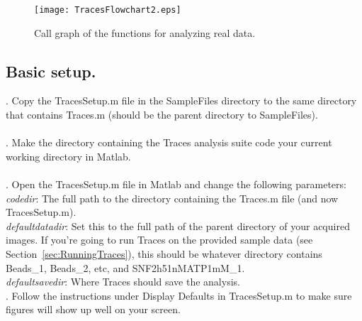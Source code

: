 \documentclass[11pt]{article}
\begin{document}
\begin{figure}[!p]
\begin{center}
\texttt{[image: TracesFlowchart2.eps]}
\caption{Call graph of the functions for analyzing real data.}
\label{fig:CodeConnectivity2}
\end{center}
\end{figure}

\newpage

\subsection{Basic setup.}

%

. Copy the TracesSetup.m file in the SampleFiles directory to the same directory that contains Traces.m (should be the parent directory to SampleFiles). \\
\\
. Make the directory containing the Traces analysis suite code your current working directory in Matlab. \\
\\
. Open the TracesSetup.m file in Matlab and change the following parameters:\\

{\it codedir}: The full path to the directory containing the Traces.m file (and now TracesSetup.m).\\

{\it defaultdatadir}: Set this to the full path of the parent directory of your acquired images. If you're going to run Traces on the provided sample data (see Section~\ref{sec:RunningTraces}), this should be whatever directory contains Beads\_1, Beads\_2, etc, and SNF2h51nMATP1mM\_1.\\

{\it defaultsavedir}: Where Traces should save the analysis.\\

. Follow the instructions under Display Defaults in TracesSetup.m to make sure figures will show up well on your screen.  \\
\end{document}
